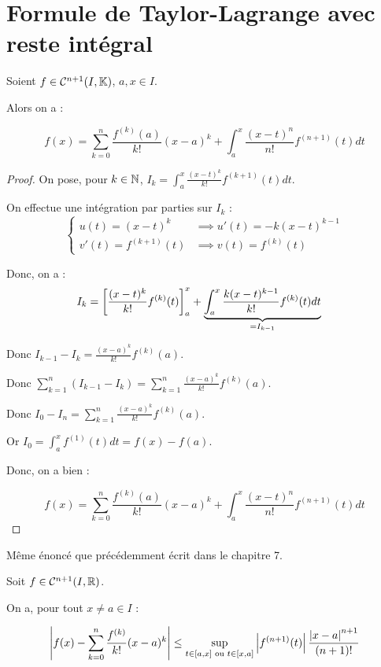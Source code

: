 \documentclass[12pt, a4paper]{report}
\begin{document}
\section{Formule de Taylor-Lagrange avec reste intégral}

\begin{theorem}
    Soient $f\in\mathcal{C}^{n+1}(I,\mathbb{K})$, $a,x\in I$.

    Alors on a :

    $$f(x) = \sum_{k=0}^n \frac{f^{(k)}(a)}{k!} (x-a)^k + \int_a^x \frac{(x-t)^n}{n!} f^{(n+1)}(t) dt$$
\end{theorem}

\begin{proof}
    On pose, pour $k\in\mathbb{N}$, $I_k=\int_a^x \frac{(x-t)^k}{k!} f^{(k+1)}(t) dt$.

    On effectue une intégration par parties sur $I_k$ :
    $$\begin{cases}
        u(t) = (x-t)^k &\implies u'(t) = -k(x-t)^{k-1} \\
        v'(t) = f^{(k+1)}(t) &\implies v(t) = f^{(k)}(t)
    \end{cases}$$

    Donc, on a :
    \begin{align*}
        I_k &= \left[\frac{(x-t)^k}{k!} f^{(k)}(t)\right]_a^x + \underbrace{\int_a^x \frac{k(x-t)^{k-1}}{k!} f^{(k)}(t) dt}_{=I_{k-1}}
    \end{align*}

    Donc $I_{k-1}-I_k = \frac{(x-a)^k}{k!} f^{(k)}(a)$.

    Donc $\sum_{k=1}^n (I_{k-1}-I_k) = \sum_{k=1}^n \frac{(x-a)^k}{k!} f^{(k)}(a)$.

    Donc $I_0 - I_n = \sum_{k=1}^n \frac{(x-a)^k}{k!} f^{(k)}(a)$.

    Or $I_0 = \int_a^x f^{(1)}(t) dt = f(x) - f(a)$.

    Donc, on a bien :

    $$f(x) = \sum_{k=0}^n \frac{f^{(k)}(a)}{k!} (x-a)^k + \int_a^x \frac{(x-t)^n}{n!} f^{(n+1)}(t) dt$$
\end{proof}

\begin{consequence}
    Même énoncé que précédemment écrit dans le chapitre 7.

    Soit $f \in \mathcal{C}^{n+1}(I,\mathbb{R})$. 

    On a, pour tout $x\ne a \in I$ :

    $$\left|f(x)-\sum_{k=0}^n\frac{f^{(k)}}{k!}(x-a)^k\right|\le\sup_{t\in[a,x] \text{ ou }t \in [x,a]}\left|f^{(n+1)}(t)\right|\frac{\left|x-a\right|^{n+1}}{(n+1)!}$$
\end{consequence}
\end{document}
